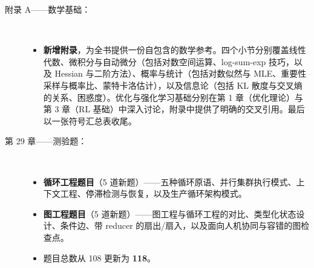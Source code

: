 \documentclass[11pt,a4paper,openany]{book}
\begin{document}
\begin{description}
  \item[附录 A——数学基础：]~
    \begin{itemize}
      \item \textbf{新增附录}，为全书提供一份自包含的数学参考。四个小节分别覆盖线性代数、微积分与自动微分（包括对数空间运算、log-sum-exp 技巧，以及 Hessian 与二阶方法）、概率与统计（包括对数似然与 MLE、重要性采样与概率比、蒙特卡洛估计），以及信息论（包括 KL 散度与交叉熵的关系、困惑度）。优化与强化学习基础分别在第 1 章（优化理论）与第 3 章（RL 基础）中深入讨论，附录中提供了明确的交叉引用。最后以一张符号汇总表收尾。
    \end{itemize}

  \item[第 29 章——测验题：]~
    \begin{itemize}
      \item \textbf{循环工程题目}（5 道新题）——五种循环原语、并行集群执行模式、上下文工程、停滞检测与恢复，以及生产循环架构模式。
      \item \textbf{图工程题目}（5 道新题）——图工程与循环工程的对比、类型化状态设计、条件边、带 reducer 的扇出/扇入，以及面向人机协同与容错的图检查点。
      \item 题目总数从 108 更新为 \textbf{118}。
    \end{itemize}


\end{description}
\end{document}
